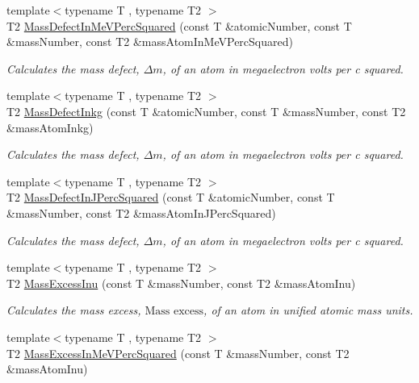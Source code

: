 \begin{DoxyCompactItemize}
{\footnotesize template$<$typename T , typename T2 $>$ }\\T2 \mbox{\hyperlink{group___e_g_x_phys-_mass_defect_gab51169bf871d0ea0ee0642fa300228fe}{Mass\+Defect\+In\+Me\+V\+Perc\+Squared}} (const T \&atomic\+Number, const T \&mass\+Number, const T2 \&mass\+Atom\+In\+Me\+V\+Perc\+Squared)
\begin{DoxyCompactList}\small\item\em Calculates the mass defect, $\Delta m$, of an atom in megaelectron volts per c squared. \end{DoxyCompactList}\item 
{\footnotesize template$<$typename T , typename T2 $>$ }\\T2 \mbox{\hyperlink{group___e_g_x_phys-_mass_defect_gad5378933021e13598a76bd8581b1e887}{Mass\+Defect\+Inkg}} (const T \&atomic\+Number, const T \&mass\+Number, const T2 \&mass\+Atom\+Inkg)
\begin{DoxyCompactList}\small\item\em Calculates the mass defect, $\Delta m$, of an atom in megaelectron volts per c squared. \end{DoxyCompactList}\item 
{\footnotesize template$<$typename T , typename T2 $>$ }\\T2 \mbox{\hyperlink{group___e_g_x_phys-_mass_defect_ga08cff1dfa3259af8f1b67ec741796e91}{Mass\+Defect\+In\+J\+Perc\+Squared}} (const T \&atomic\+Number, const T \&mass\+Number, const T2 \&mass\+Atom\+In\+J\+Perc\+Squared)
\begin{DoxyCompactList}\small\item\em Calculates the mass defect, $\Delta m$, of an atom in megaelectron volts per c squared. \end{DoxyCompactList}\item 
{\footnotesize template$<$typename T , typename T2 $>$ }\\T2 \mbox{\hyperlink{group___e_g_x_phys-_mass_excess_ga61c6f557bd742126c0c76e88cf7740ad}{Mass\+Excess\+Inu}} (const T \&mass\+Number, const T2 \&mass\+Atom\+Inu)
\begin{DoxyCompactList}\small\item\em Calculates the mass excess, $\text{Mass excess}$, of an atom in unified atomic mass units. \end{DoxyCompactList}\item 
{\footnotesize template$<$typename T , typename T2 $>$ }\\T2 \mbox{\hyperlink{group___e_g_x_phys-_mass_excess_ga99a93b88df3425b7a153c32c05fa5a88}{Mass\+Excess\+In\+Me\+V\+Perc\+Squared}} (const T \&mass\+Number, const T2 \&mass\+Atom\+Inu)

\end{DoxyCompactItemize}
